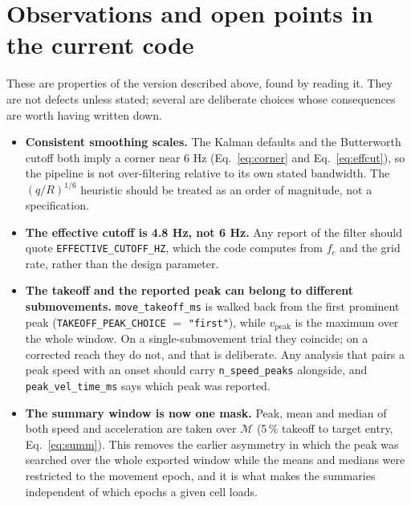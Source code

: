 \documentclass[11pt,a4paper]{article}
\newcommand{\code}[1]{\texttt{\small #1}}
\begin{document}
\section{Observations and open points in the current code}
\label{sec:observations}

These are properties of the version described above, found by reading it. They
are not defects unless stated; several are deliberate choices whose consequences
are worth having written down.

\begin{itemize}[leftmargin=*,itemsep=5pt]

\item \textbf{Consistent smoothing scales.} The Kalman defaults and the
Butterworth cutoff both imply a corner near 6 Hz (Eq.~\eqref{eq:corner} and
Eq.~\eqref{eq:effcut}), so the pipeline is not over-filtering relative to its own
stated bandwidth. The $(q/R)^{1/6}$ heuristic should be treated as an order of
magnitude, not a specification.

\item \textbf{The effective cutoff is 4.8 Hz, not 6 Hz.} Any report of the
filter should quote \code{EFFECTIVE\_CUTOFF\_HZ}, which the code computes from
$f_c$ and the grid rate, rather than the design parameter.

\item \textbf{The takeoff and the reported peak can belong to different
submovements.} \code{move\_takeoff\_ms} is walked back from the first
prominent peak (\code{TAKEOFF\_PEAK\_CHOICE} $=$ \code{"first"}), while
$v_{\text{peak}}$ is the maximum over the whole window. On a single-submovement
trial they coincide; on a corrected reach they do not, and that is deliberate.
Any analysis that pairs a peak speed with an onset should carry
\code{n\_speed\_peaks} alongside, and \code{peak\_vel\_time\_ms} says which
peak was reported.

\item \textbf{The summary window is now one mask.} Peak, mean and median of both
speed and acceleration are taken over $\mathcal{M}$ (5\,\% takeoff to target
entry, Eq.~\eqref{eq:summ}). This removes the earlier asymmetry in which the
peak was searched over the whole exported window while the means and medians
were restricted to the movement epoch, and it is what makes the summaries
independent of which epochs a given cell loads.


\end{itemize}
\end{document}
